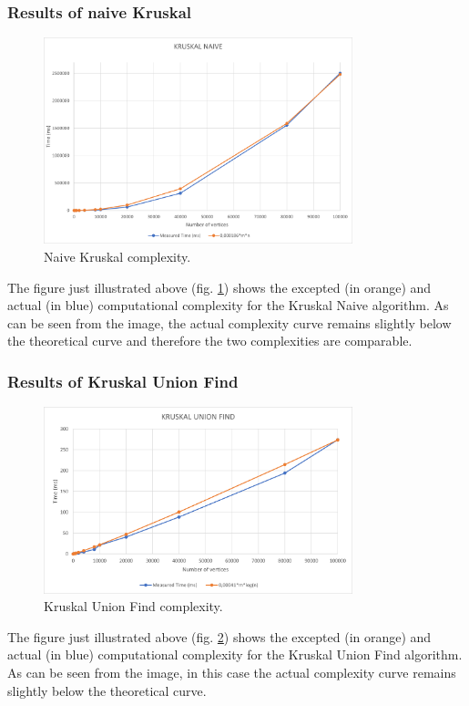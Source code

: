 \subsubsection{Results of naive Kruskal}
\begin{figure}[H]
    \centering
    \includegraphics[width=0.8\textwidth]{../img/KruskalNaive.png}
    \caption{Naive Kruskal complexity.}
    \label{fig:kruskal}
\end{figure}
The figure just illustrated above (fig. \ref{fig:kruskal}) shows the excepted (in orange) and actual 
(in blue) computational complexity for the Kruskal Naive algorithm. As can be seen from the image, 
the actual complexity curve remains slightly below the theoretical curve and therefore the two complexities are comparable.

\subsubsection{Results of Kruskal Union Find}
\begin{figure}[H]
    \centering
    \includegraphics[width=0.8\textwidth]{../img/KruskalUnionFind.png}
    \caption{Kruskal Union Find complexity.}
    \label{fig:kruskaluf}
\end{figure}
The figure just illustrated above (fig. \ref{fig:kruskaluf}) shows the excepted (in orange) and actual 
(in blue) computational complexity for the Kruskal Union Find algorithm. As can be seen from the image, in this case the actual 
complexity curve remains slightly below the theoretical curve.

